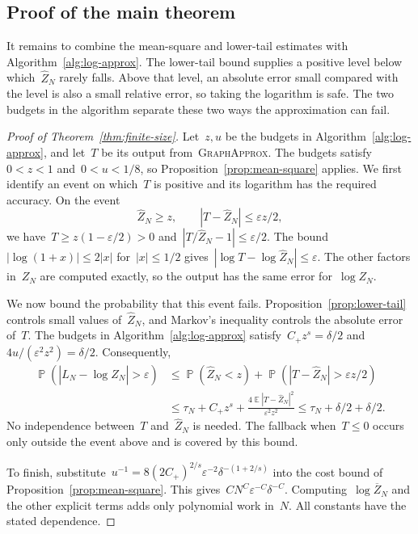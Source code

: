 \documentclass[letterpaper,11pt,reqno]{amsart}
\renewcommand{\leq}{\leqslant}
\renewcommand{\geq}{\geqslant}
\DeclareMathOperator{\E}{\mathds{E}}
\DeclareMathOperator{\pr}{\mathds{P}}
\begin{document}
\subsection{Proof of the main theorem}\label{subsec:main-proofs}

It remains to combine the mean-square and lower-tail estimates with Algorithm~\ref{alg:log-approx}. The lower-tail bound supplies a positive level below which~$\widehat Z_N$ rarely falls. Above that level, an absolute error small compared with the level is also a small relative error, so taking the logarithm is safe. The two budgets in the algorithm separate these two ways the approximation can fail.

\begin{proof}[Proof of Theorem~\ref{thm:finite-size}]
Let~$z,u$ be the budgets in Algorithm~\ref{alg:log-approx}, and let~$T$ be its output from~\textsc{GraphApprox}. The budgets satisfy~$0<z<1$ and~$0<u<1/8$, so Proposition~\ref{prop:mean-square} applies. We first identify an event on which~$T$ is positive and its logarithm has the required accuracy. On the event
\begin{equation*}
\widehat Z_N\geq z,\qquad |T-\widehat Z_N|\leq\varepsilon z/2,
\end{equation*}
we have~$T\geq z(1-\varepsilon/2)>0$ and~$|T/\widehat Z_N-1|\leq\varepsilon/2$. The bound~$|\log(1+x)|\leq2|x|$ for~$|x|\leq1/2$ gives~$|\log T-\log\widehat Z_N|\leq\varepsilon$. The other factors in~$Z_N$ are computed exactly, so the output has the same error for~$\log Z_N$.

We now bound the probability that this event fails. Proposition~\ref{prop:lower-tail} controls small values of~$\widehat Z_N$, and Markov's inequality controls the absolute error of~$T$. The budgets in Algorithm~\ref{alg:log-approx} satisfy~$C_+z^s=\delta/2$ and~$4u/(\varepsilon^2z^2)=\delta/2$. Consequently,
\begin{align*}
\pr(|\widehat L_N-\log Z_N|>\varepsilon)
&\leq\pr(\widehat Z_N<z)+\pr(|T-\widehat Z_N|>\varepsilon z/2)\\
&\leq\tau_N+C_+z^s+\frac{4\E|T-\widehat Z_N|^2}{\varepsilon^2z^2}
\leq\tau_N+\delta/2+\delta/2.
\end{align*}
No independence between~$T$ and~$\widehat Z_N$ is needed. The fallback when~$T\leq0$ occurs only outside the event above and is covered by this bound.

To finish, substitute~$u^{-1}=8(2C_+)^{2/s}\varepsilon^{-2}\delta^{-(1+2/s)}$ into the cost bound of Proposition~\ref{prop:mean-square}. This gives~$CN^C\varepsilon^{-C}\delta^{-C}$. Computing~$\log\overline Z_N$ and the other explicit terms adds only polynomial work in~$N$. All constants have the stated dependence.
\end{proof}



\end{document}
